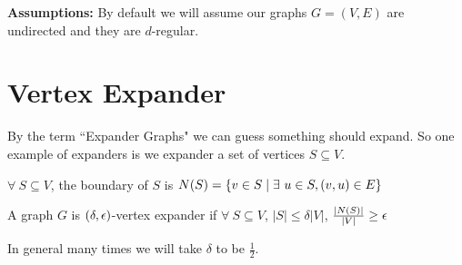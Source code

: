 \textbf{Assumptions:} By default we will assume our graphs $G=(V,E)$ are undirected and they are $d$-regular. 

\parinn

\section{Vertex Expander}
By the term ``Expander Graphs" we can guess something should expand. So one example of expanders is we expander a set of vertices $S\subseteq V$.
\begin{definition}
	$\forall\ S\subseteq V$, the boundary of $S$ is $N(S)=\{v\in S\mid \exists\ u\in S, (v,u)\in E\}$
\end{definition}
\begin{definition}
	A graph $G$ is $(\delta,\epsilon)$-vertex expander if $\forall\ S\subseteq V$, $|S|\leq \delta |V|$, $\frac{|N(S)|}{|V|}\geq \epsilon$
\end{definition}
In general many times we will take $\delta $ to be $\frac12$.

